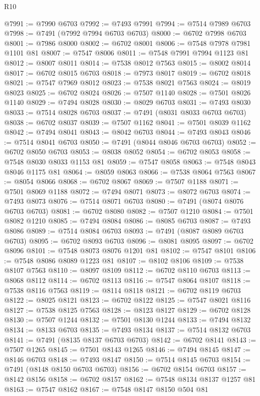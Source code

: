 \begin{lexlean}{R10}
\begin{coremodule}
@7991 := @7990 @6703
@7992 := @7493 @7991
@7994 := @7514 @7989 @6703
@7998 := @7491 (@7992 @7994 @6703 @6703)
@8000 := @6702 @7998 @6703
@8001 := @7986 @8000
@8002 := @6702 @8001
@8006 := @7548 @7978 @7981 @1101 @81
@8007 := @7547 @8006
@8011 := @7548 @7991 @7994 @1123 @81
@8012 := @8007 @8011
@8014 := @7538 @8012 @7563
@8015 := @8002 @8014
@8017 := @6702 @8015 @6703
@8018 := @7973 @8017
@8019 := @6702 @8018
@8021 := @7547 @7969 @8012
@8023 := @7538 @8021 @7563
@8024 := @8019 @8023
@8025 := @6702 @8024
@8026 := @7507 @1140
@8028 := @7501 @8026 @1140
@8029 := @7494 @8028
@8030 := @8029 @6703
@8031 := @7493 @8030
@8033 := @7514 @8028 @6703
@8037 := @7491 (@8031 @8033 @6703 @6703)
@8038 := @6702 @8037
@8039 := @7507 @1162
@8041 := @7501 @8039 @1162
@8042 := @7494 @8041
@8043 := @8042 @6703
@8044 := @7493 @8043
@8046 := @7514 @8041 @6703
@8050 := @7491 (@8044 @8046 @6703 @6703)
@8052 := @6702 @8050 @6703
@8053 := @8038 @8052
@8054 := @6702 @8053
@8058 := @7548 @8030 @8033 @1153 @81
@8059 := @7547 @8058
@8063 := @7548 @8043 @8046 @1175 @81
@8064 := @8059 @8063
@8066 := @7538 @8064 @7563
@8067 := @8054 @8066
@8068 := @6702 @8067
@8069 := @7507 @1188
@8071 := @7501 @8069 @1188
@8072 := @7494 @8071
@8073 := @8072 @6703
@8074 := @7493 @8073
@8076 := @7514 @8071 @6703
@8080 := @7491 (@8074 @8076 @6703 @6703)
@8081 := @6702 @8080
@8082 := @7507 @1210
@8084 := @7501 @8082 @1210
@8085 := @7494 @8084
@8086 := @8085 @6703
@8087 := @7493 @8086
@8089 := @7514 @8084 @6703
@8093 := @7491 (@8087 @8089 @6703 @6703)
@8095 := @6702 @8093 @6703
@8096 := @8081 @8095
@8097 := @6702 @8096
@8101 := @7548 @8073 @8076 @1201 @81
@8102 := @7547 @8101
@8106 := @7548 @8086 @8089 @1223 @81
@8107 := @8102 @8106
@8109 := @7538 @8107 @7563
@8110 := @8097 @8109
@8112 := @6702 @8110 @6703
@8113 := @8068 @8112
@8114 := @6702 @8113
@8116 := @7547 @8064 @8107
@8118 := @7538 @8116 @7563
@8119 := @8114 @8118
@8121 := @6702 @8119 @6703
@8122 := @8025 @8121
@8123 := @6702 @8122
@8125 := @7547 @8021 @8116
@8127 := @7538 @8125 @7563
@8128 := @8123 @8127
@8129 := @6702 @8128
@8130 := @7507 @1244
@8132 := @7501 @8130 @1244
@8133 := @7494 @8132
@8134 := @8133 @6703
@8135 := @7493 @8134
@8137 := @7514 @8132 @6703
@8141 := @7491 (@8135 @8137 @6703 @6703)
@8142 := @6702 @8141
@8143 := @7507 @1265
@8145 := @7501 @8143 @1265
@8146 := @7494 @8145
@8147 := @8146 @6703
@8148 := @7493 @8147
@8150 := @7514 @8145 @6703
@8154 := @7491 (@8148 @8150 @6703 @6703)
@8156 := @6702 @8154 @6703
@8157 := @8142 @8156
@8158 := @6702 @8157
@8162 := @7548 @8134 @8137 @1257 @81
@8163 := @7547 @8162
@8167 := @7548 @8147 @8150 @504 @81

\end{coremodule}
\end{lexlean}
